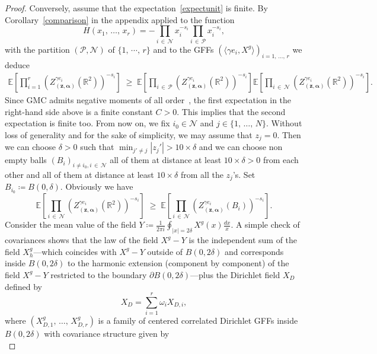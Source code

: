 \documentclass[AHL,Unicode,longabstracts,published]{cedram}
\renewcommand{\geq}{\;\geqslant\;}
\newcommand{\clP}{\mathcal{P}}
\newcommand{\clN}{\mathcal{N}}
\newcommand{\R}{\mathbb{R}}
\newcommand{\E}{\mathbb{E}}
\begin{document}
\begin{proof}
Conversely, assume that the expectation~\eqref{expectunit} is finite. By Corollary~\ref{comparison} in the appendix applied to the function
\[
H(x_1,\,\dots,\,x_r)= -\prod_{i\,\in\,\clN} x_i^{- s_i} \prod_{i\,\in\,\clP} x_i^{- s_i},
\]
with the partition $(\clP,\clN)$ of $\{1,\,\cdots,\,r\}$ and to the GFFs $(\langle \gamma e_i,X^g\rangle)_{i=1,\,\dots,\,r}$ we deduce
\begin{align*}
\E \left[\prod_{i=1}^{r} \left(Z_{\left(\bm z,\bm \alpha\right)}^{\gamma e_i}\left(\R^2\right)\right)^{- s_i} \right] \geq \E \left[\prod_{i\,\in\,\clP} \left(Z_{\left(\bm z,\bm \alpha\right)}^{\gamma e_i} \left(\R^2\right)\right)^{- s_i} \right] \E \left[\prod_{i\,\in\,\clN} \left(Z_{\left(\bm z,\bm \alpha\right)}^{\gamma e_i} \left(\R^2\right)\right)^{- s_i} \right].
\end{align*}
Since GMC admits negative moments of all order~\cite[Theorem~2.12]{review}, the first expectation in the right-hand side above is a finite constant $C>0$. This implies that the second expectation is finite too. From now on, we fix $i_0\in \clN$ and $j\in\{1,\,\dots,\,N\}$. Without loss of generality and for the sake of simplicity, we may assume that $z_j=0$. Then we can choose $\delta>0$ such that $\min_{j'\not=j}|z_j'|>10\times\delta$ and we can choose non empty balls $(B_i)_{i\not= i_0,i\,\in\,\clN}$ all of them at distance at least $10\times\delta>0$ from each other and all of them at distance at least $10\times \delta$ from all the $z_j$'s. Set $B_{i_0}\coloneqq B(0,\delta)$. Obviously we have
\[
\E \left[\prod_{i\,\in \,\clN} \left(Z_{\left(\bm z,\bm \alpha\right)}^{\gamma e_i} \left(\R^2\right)\right)^{- s_i} \right] \geq \E \left[\prod_{i\,\in\,\clN} \left(Z_{\left(\bm z,\bm \alpha\right)}^{\gamma e_i} \left(B_i\right)\right)^{- s_i} \right].
\]
Consider the mean value of the field $Y\coloneqq \frac{1}{2\pi i}\oint_{|x|=2\delta}X^g(x)\frac{dx}{x}$. A simple check of covariances shows that the law of the field $X^g-Y$ is the independent sum of the field $X^g_h$---which coincides with $X^g-Y$ outside of $B(0,2\delta)$ and corresponds inside $ B(0,2\delta)$ to the harmonic extension (component by component) of the field $X^g-Y$ restricted to the boundary $ \partial B(0,2\delta)$---plus the Dirichlet field $X_D$ defined by
\begin{equation}
X_D=\sum_{i=1}^{r}\omega_iX_{D,i},
\end{equation}
where $(X^g_{D,1},\,\dots,\,X^g_{D,r})$ is a family of centered correlated Dirichlet GFFs inside $B(0,2\delta)$ with covariance structure given by
\begin{equation*}

\end{equation*}
\end{proof}
\end{document}
